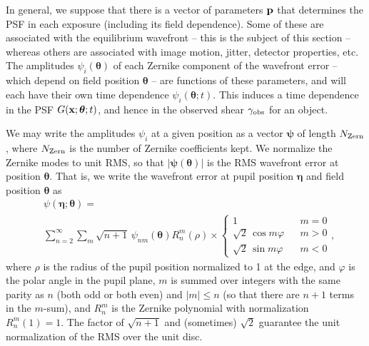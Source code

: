 \documentclass[usenatbib]{mnras}
\begin{document}
In general, we suppose that there is a vector of parameters ${\bf p}$
that determines the PSF in each exposure (including its field
dependence). Some of these are associated with the equilibrium
wavefront -- this is the subject of this section -- whereas others are
associated with image motion, jitter, detector properties, etc. The
amplitudes $\psi_i({\boldsymbol\theta})$ of each Zernike component of
the wavefront error -- which depend on field position
${\boldsymbol\theta}$ -- are functions of these parameters, and will
each have their own time dependence
$\psi_i({\boldsymbol\theta};t)$. This induces a time dependence in the
PSF $G({\bf x};{\boldsymbol\theta};t)$, and hence in the observed
shear $\gamma_{\rm obs}$ for an object.

We may write the amplitudes $\psi_i$ at a given position as a vector
${\boldsymbol\psi}$ of length $N_{\rm Zern}$, where $N_{\rm Zern}$ is
the number of Zernike coefficients kept. We normalize the Zernike
modes to unit RMS, so that $|{\boldsymbol\psi}({\boldsymbol\theta})|$
is the RMS wavefront error at position ${\boldsymbol\theta}$. That is,
we write the wavefront error at pupil position ${\boldsymbol\eta}$ and
field position ${\boldsymbol\theta}$ as
\begin{align}
&\psi({\boldsymbol\eta};{\boldsymbol\theta}) = \nonumber\\
&\sum_{n=2}^\infty
\sum_{m} \sqrt{n+1}\,\psi_{nm}({\boldsymbol\theta}) R_n^m(\rho)
\times\left\{\begin{array}{ccc} 1 & & m=0 \\ \sqrt2\,\cos m\varphi & &
m>0 \\ \sqrt2\,\sin m\varphi & & m<0 \end{array} \right.,
\end{align}
where $\rho$ is the radius of the pupil position normalized to 1 at
the edge, and $\varphi$ is the polar angle in the pupil plane, $m$ is
summed over integers with the same parity as $n$ (both odd or both
even) and $|m|\le n$ (so that there are $n+1$ terms in the $m$-sum),
and $R_n^m$ is the Zernike polynomial with normalization
$R_n^m(1)=1$. The factor of $\sqrt{n+1}$ and (sometimes) $\sqrt2$
guarantee the unit normalization of the RMS over the unit disc.
\end{document}
